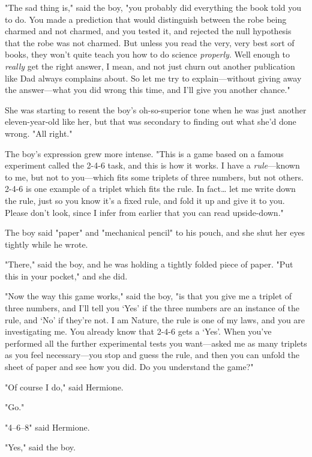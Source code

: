 "The sad thing is," said the boy, "you probably did everything the book told 
you to do. You made a prediction that would distinguish between the robe being 
charmed and not charmed, and you tested it, and rejected the null hypothesis 
that the robe was not charmed. But unless you read the very, very best sort of 
books, they won't quite teach you how to do science \emph{properly}. Well 
enough to \emph{really} get the right answer, I mean, and not just churn out 
another publication like Dad always complains about. So let me try to 
explain---without giving away the answer---what you did wrong this time, and 
I'll give you another chance."

She was starting to resent the boy's oh-so-superior tone when he was just 
another eleven-year-old like her, but that was secondary to finding out what 
she'd done wrong. "All right."

The boy's expression grew more intense. "This is a game based on a famous 
experiment called the 2-{4}-{6} task, and this is how it works. I have a 
\emph{rule}---known to me, but not to you---which fits some triplets of three 
numbers, but not others. 2-{4}-{6} is one example of a triplet which fits the rule. 
In fact{\ldots} let me write down the rule, just so you know it's a fixed rule, 
and fold it up and give it to you. Please don't look, since I infer from 
earlier that you can read upside-down."

The boy said "paper" and "mechanical pencil" to his pouch, and she shut her 
eyes tightly while he wrote.

"There," said the boy, and he was holding a tightly folded piece of paper. "Put 
this in your pocket," and she did.

"Now the way this game works," said the boy, "is that you give me a triplet of 
three numbers, and I'll tell you `Yes' if the three numbers are an instance of 
the rule, and `No' if they're not. I am Nature, the rule is one of my laws, and 
you are investigating me. You already know that 2-{4}-{6} gets a `Yes'. When you've 
performed all the further experimental tests you want---asked me as many 
triplets as you feel necessary---you stop and guess the rule, and then you can 
unfold the sheet of paper and see how you did. Do you understand the game?"

"Of course I do," said Hermione.

"Go."

"4--{6}--{8}" said Hermione.

"Yes," said the boy.

